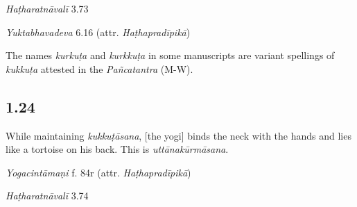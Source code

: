 \begin{ekdosis}
\begin{testimonia}[hp01_023]
\emph{Haṭharatnāvalī} 3.73

\begin{versinnote}
\end{versinnote}

\emph{Yuktabhavadeva} 6.16 (attr. \emph{Haṭhapradīpikā})

\begin{versinnote}
\end{versinnote}


\end{testimonia}

\begin{philcomm}[hp01_023]
The names \emph{kurkuṭa} and \emph{kurkkuṭa} in some manuscripts are variant spellings of \emph{kukkuṭa} attested in the \emph{Pañcatantra} (M-W).
\end{philcomm}

\subsection*{1.24}
\begin{translation}[hp01_024]
While maintaining \emph{kukkuṭāsana}, [the yogi] binds the neck with the hands and lies like a tortoise on his back. This is \emph{uttānakūrmāsana}.
\end{translation}

\begin{testimonia}[hp01_024]
\emph{Yogacintāmaṇi} f. 84r (attr. \emph{Haṭhapradīpikā})

\begin{versinnote}
\end{versinnote}

\emph{Haṭharatnāvalī} 3.74

\begin{versinnote}
\end{versinnote}


\end{testimonia}
\end{ekdosis}
